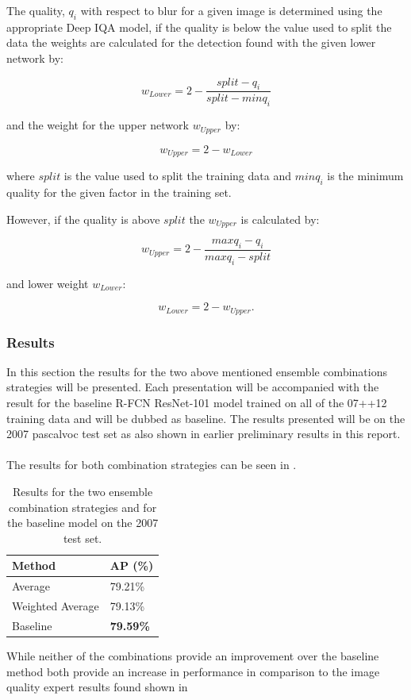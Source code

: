 The quality, $q_i$ with respect to blur for a given image is determined using the appropriate Deep IQA model, if the quality is below the value used to split the data the weights are calculated for the detection found with the given lower network by:

\begin{equation}
	w_{Lower} = 2 - \frac{split - q_i}{split - minq_i}
\end{equation}

and the weight for the upper network $w_{Upper}$ by:

\begin{equation}
	w_{Upper} = 2 - w_{Lower}
\end{equation}

where $split$ is the value used to split the training data and $minq_i$ is the minimum quality for the given factor in the training set.

However, if the quality is above $split$ the $w_{Upper}$ is calculated by:

\begin{equation}
	w_{Upper} = 2 - \frac{maxq_i - q_i}{maxq_i - split}
\end{equation}

and lower weight $w_{Lower}$:

\begin{equation}
	w_{Lower} = 2 - w_{Upper}.
\end{equation}

\subsubsection{Results}
In this section the results for the two above mentioned ensemble combinations strategies will be presented. Each presentation will be accompanied with the result for the baseline R-FCN ResNet-101 model trained on all of the 07++12 training data and will be dubbed as baseline. The results presented will be on the 2007 \gls{pascalvoc} test set as also shown in earlier preliminary results in this report.
\\\\
The results for both combination strategies can be seen in .

\begin{table}[h]
\centering
\caption{Results for the two ensemble combination strategies and for the baseline model on the 2007 test set.}
\label{tab:avgres1}
\begin{tabular}{|l|l|}
\hline
\textbf{Method}           & \textbf{AP (\%)} \\ \hline
Average          & 79.21\% \\ \hline
Weighted Average & 79.13\% \\ \hline
Baseline         & \textbf{79.59\%} \\ \hline
\end{tabular}
\end{table}

While neither of the combinations provide an improvement over the baseline method both provide an increase in performance in comparison to the image quality expert results found shown in  


